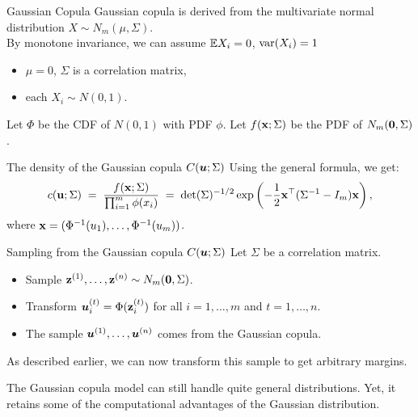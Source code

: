 \documentclass[11pt,handout,aspectratio=169]{beamer}
\begin{document}
\begin{frame}{Gaussian Copula}
Gaussian copula is derived from the multivariate normal distribution $X\sim N_m(\mu,\Sigma)$.\\[3mm]
By monotone invariance, we can assume $\mathbb E X_i=0$, $\mathrm{var}(X_i)=1$
\begin{itemize}
	\item  $\mu=0$, $\Sigma$ is a correlation matrix,
	\item each $X_i\sim N(0,1)$. 
\end{itemize}
 

Let $\Phi$ be the CDF of $N(0,1)$ with PDF $\phi$. Let $f(\mathbf{x};\Sigma)$ be the PDF of $N_m(\boldsymbol 0,\Sigma)$.
\begin{alertblock}{The density of the Gaussian copula $C(\boldsymbol u;\Sigma)$}
	Using the general formula, we get:
	\[ c(\mathbf{u}; \Sigma) \;=\; \frac{f(\mathbf{x};\Sigma)}{\prod_{i=1}^m \phi(x_i)}\;=\; \det(\Sigma)^{-1/2} \exp\left(-\frac{1}{2} \mathbf{x}^\top (\Sigma^{-1} - I_m) \mathbf{x}\right), \]
	where $\mathbf{x}=(\Phi^{-1}(u_1),\ldots,\Phi^{-1}(u_m))$.
\end{alertblock}
 \end{frame}

\begin{frame}{Sampling from the Gaussian copula $C(\boldsymbol u;\Sigma)$}
Let $\Sigma$ be a correlation matrix.\\[3mm]
\begin{itemize}
	\item Sample $\mathbf{z}^{(1)},\ldots,\mathbf{z}^{(n)}\sim N_m(\boldsymbol 0,\Sigma)$.\\[3mm]
	\item Transform $\boldsymbol u^{(t)}_i=\Phi(\mathbf{z}^{(t)}_i)$ for all $i=1,\ldots,m$ and $t=1,\ldots,n$. \\[3mm]
	\item The sample $\boldsymbol u^{(1)},\ldots,\boldsymbol u^{(n)}$ comes from the Gaussian copula. \\[3mm]
\end{itemize}	
	As described earlier, we can now transform this sample to get arbitrary margins.\\[3mm]
	\begin{block}{}
		The Gaussian copula model can still handle quite general distributions. Yet, it retains some of the computational advantages of the Gaussian distribution.
	\end{block}

\end{frame}
\end{document}
